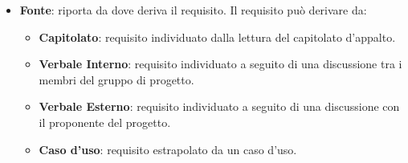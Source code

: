 \begin{itemize}
\item \textbf{Fonte}: riporta da dove deriva il requisito. Il requisito può derivare da:
\begin{itemize}
\item \textbf{Capitolato}: requisito individuato dalla lettura del capitolato d'appalto.
\item \textbf{Verbale Interno}: requisito individuato a seguito di una discussione tra i membri del gruppo di progetto.
\item \textbf{Verbale Esterno}: requisito individuato a seguito di una discussione con il proponente del progetto.
\item \textbf{Caso d'uso}: requisito estrapolato da un caso d'uso.
\end{itemize}
\end{itemize}
